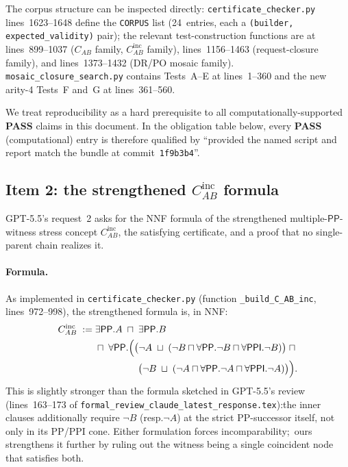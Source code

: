 \documentclass[11pt]{article}
\newcommand{\PP}{\mathsf{PP}}
\newcommand{\PPI}{\mathsf{PPI}}
\newcommand{\PASS}{\textcolor{black!70!green}{\textbf{PASS}}}
\begin{document}
The corpus structure can be inspected directly:\@
\texttt{certificate\_checker.py} lines~1623--1648 define
the \texttt{CORPUS} list (24~entries, each a
\texttt{(builder, expected\_validity)} pair); the relevant
test-construction functions are at
lines~899--1037 (\(C_{AB}\) family, \(C_{AB}^{\mathrm{inc}}\)
family), lines~1156--1463 (request-closure family), and
lines~1373--1432 (DR/PO mosaic family).
\texttt{mosaic\_closure\_search.py} contains Tests~A--E at
lines~1--360 and the new arity-4 Tests~F and~G at lines~361--560.

We treat reproducibility as a hard prerequisite to all
computationally-supported \PASS{} claims in this document.  In
the obligation table below, every \PASS{} (computational) entry
is therefore qualified by ``provided the named script and report
match the bundle at commit~\texttt{1f9b3b4}''.

\subsection{Item 2: the strengthened \(C_{AB}^{\mathrm{inc}}\) formula}
\label{sec:CABinc}

GPT-5.5's request~2 asks for the NNF formula of the strengthened
multiple-\(\PP\)-witness stress concept \(C_{AB}^{\mathrm{inc}}\),
the satisfying certificate, and a proof that no single-parent
chain realizes it.

\paragraph{Formula.}  As implemented in
\texttt{certificate\_checker.py} (function \texttt{\_build\_C\_AB\_inc},
lines~972--998), the strengthened formula is, in NNF:
\begin{equation}
\label{eq:cab_inc}
\begin{aligned}
C_{AB}^{\mathrm{inc}} \;:=\;
& \exists\PP.A \;\sqcap\; \exists\PP.B \\
& \sqcap\; \forall\PP.\Bigl(
    \bigl(\neg A \;\sqcup\; (\neg B \sqcap \forall\PP.\neg B \sqcap \forall\PPI.\neg B)\bigr)
    \;\sqcap \\
& \hspace{4.5em}
    \bigl(\neg B \;\sqcup\; (\neg A \sqcap \forall\PP.\neg A \sqcap \forall\PPI.\neg A)\bigr)
  \Bigr).
\end{aligned}
\end{equation}
This is slightly stronger than the formula sketched in
GPT-5.5's review (lines~163--173 of
\texttt{formal\_review\_claude\_latest\_response.tex}):\@ the inner
clauses additionally require \(\neg B\) (resp.\@ \(\neg A\)) at
the strict PP-successor itself, not only in its PP/PPI cone.
Either formulation forces incomparability;\ ours strengthens it
further by ruling out the witness being a single coincident node
that satisfies both.
\end{document}
